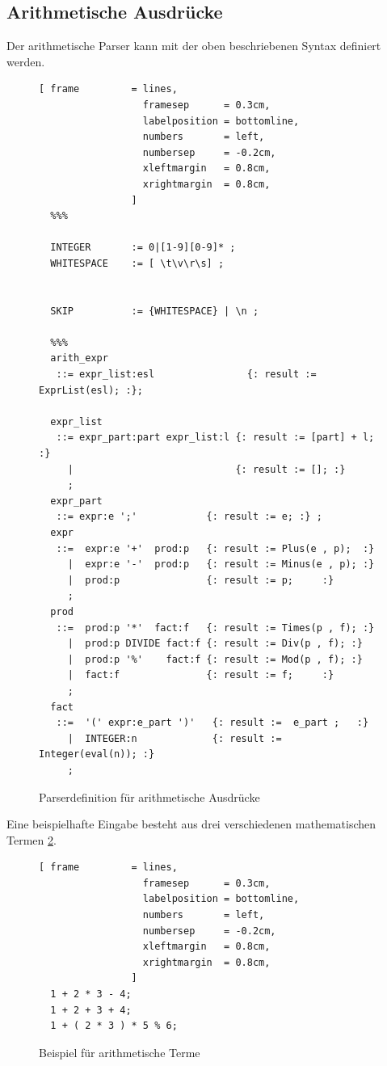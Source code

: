 \subsection{Arithmetische Ausdrücke}
Der arithmetische Parser  kann mit der oben beschriebenen Syntax definiert werden.
\begin{figure}[!ht]
\begin{Verbatim}[ frame         = lines, 
                  framesep      = 0.3cm, 
                  labelposition = bottomline,
                  numbers       = left,
                  numbersep     = -0.2cm,
                  xleftmargin   = 0.8cm,
                  xrightmargin  = 0.8cm,
                ]
  %%%

  INTEGER       := 0|[1-9][0-9]* ;
  WHITESPACE    := [ \t\v\r\s] ;


  SKIP          := {WHITESPACE} | \n ;

  %%%
  arith_expr 
   ::= expr_list:esl                {: result := ExprList(esl); :};

  expr_list 
   ::= expr_part:part expr_list:l {: result := [part] + l; :} 
     |                            {: result := []; :}
     ;
  expr_part 
   ::= expr:e ';'            {: result := e; :} ;
  expr 
   ::=  expr:e '+'  prod:p   {: result := Plus(e , p);  :} 
     |  expr:e '-'  prod:p   {: result := Minus(e , p); :} 
     |  prod:p               {: result := p;     :}
     ;
  prod 
   ::=  prod:p '*'  fact:f   {: result := Times(p , f); :}
     |  prod:p DIVIDE fact:f {: result := Div(p , f); :} 
     |  prod:p '%'    fact:f {: result := Mod(p , f); :} 
     |  fact:f               {: result := f;     :}
     ;
  fact 
   ::=  '(' expr:e_part ')'   {: result :=  e_part ;   :} 
     |  INTEGER:n             {: result := Integer(eval(n)); :} 
     ;
\end{Verbatim}
\caption{Parserdefinition für arithmetische Ausdrücke}
\label{fig:example_arithmetic_grammer}
\end{figure}
%
Eine beispielhafte Eingabe besteht aus drei verschiedenen mathematischen Termen \ref{fig:example_arithmetic_input}.
\begin{figure}[!ht]
\begin{Verbatim}[ frame         = lines, 
                  framesep      = 0.3cm, 
                  labelposition = bottomline,
                  numbers       = left,
                  numbersep     = -0.2cm,
                  xleftmargin   = 0.8cm,
                  xrightmargin  = 0.8cm,
                ]
  1 + 2 * 3 - 4;
  1 + 2 + 3 + 4;
  1 + ( 2 * 3 ) * 5 % 6;
\end{Verbatim}
\caption{Beispiel für arithmetische Terme}
\label{fig:example_arithmetic_input}
\end{figure}
